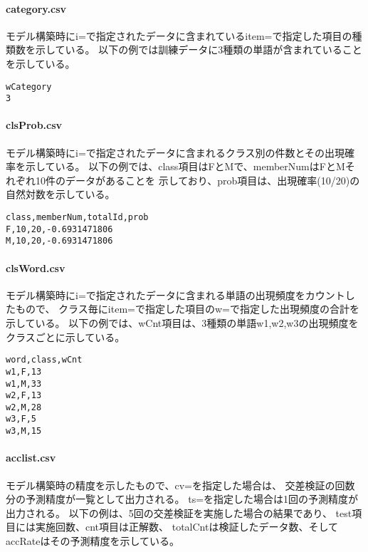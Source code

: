 \paragraph{category.csv}
モデル構築時にi=で指定されたデータに含まれているitem=で指定した項目の種類数を示している。
以下の例では訓練データに3種類の単語が含まれていることを示している。

\begin{Verbatim}[baselinestretch=0.7,frame=single]
wCategory
3
\end{Verbatim}

\paragraph{clsProb.csv}

モデル構築時にi=で指定されたデータに含まれるクラス別の件数とその出現確率を示している。
以下の例では、class項目はFとMで、memberNumはFとMそれぞれ10件のデータがあることを
示しており、prob項目は、出現確率(10/20)の自然対数を示している。

\begin{Verbatim}[baselinestretch=0.7,frame=single]
class,memberNum,totalId,prob
F,10,20,-0.6931471806
M,10,20,-0.6931471806
\end{Verbatim}

\paragraph{clsWord.csv}
モデル構築時にi=で指定されたデータに含まれる単語の出現頻度をカウントしたもので、
クラス毎にitem=で指定した項目のw=で指定した出現頻度の合計を示している。
以下の例では、wCnt項目は、3種類の単語w1,w2,w3の出現頻度をクラスごとに示している。

\begin{Verbatim}[baselinestretch=0.7,frame=single]
word,class,wCnt
w1,F,13
w1,M,33
w2,F,13
w2,M,28
w3,F,5
w3,M,15
\end{Verbatim}

\paragraph{acclist.csv}
モデル構築時の精度を示したもので、cv=を指定した場合は、
交差検証の回数分の予測精度が一覧として出力される。
ts=を指定した場合は1回の予測精度が出力される。
以下の例は、5回の交差検証を実施した場合の結果であり、
test項目には実施回数、cnt項目は正解数、
totalCntは検証したデータ数、そしてaccRateはその予測精度を示している。

